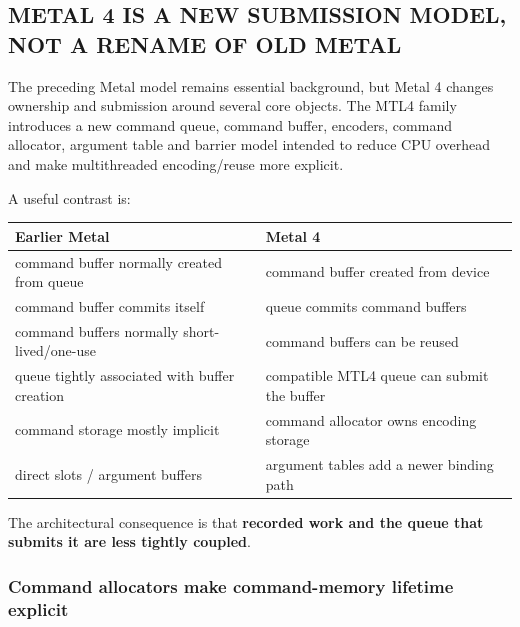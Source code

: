 \subsection{METAL 4 IS A NEW SUBMISSION MODEL, NOT A RENAME OF OLD METAL}\label{05-engine-i-ch022-metal-4-is-a-new-submission-model-not-a-rename-of-old-metal}

The preceding Metal model remains essential background, but Metal 4 changes ownership and submission around several core objects. The MTL4 family introduces a new command queue, command buffer, encoders, command allocator, argument table and barrier model intended to reduce CPU overhead and make multithreaded encoding/reuse more explicit.

A useful contrast is:

{\def\LTcaptype{none} %
\begin{longtable}[]{@{}
  >{\raggedright\arraybackslash}p{}
  >{\raggedright\arraybackslash}p{}@{}}
\toprule\noalign{}
\begin{minipage}[b]{\linewidth}\raggedright
Earlier Metal
\end{minipage} & \begin{minipage}[b]{\linewidth}\raggedright
Metal 4
\end{minipage} \\
\midrule\noalign{}
\endhead
\bottomrule\noalign{}
\endlastfoot
command buffer normally created from queue & command buffer created from device \\
command buffer commits itself & queue commits command buffers \\
command buffers normally short-lived/one-use & command buffers can be reused \\
queue tightly associated with buffer creation & compatible MTL4 queue can submit the buffer \\
command storage mostly implicit & command allocator owns encoding storage \\
direct slots / argument buffers & argument tables add a newer binding path \\
\end{longtable}
}

The architectural consequence is that \textbf{recorded work and the queue that submits it are less tightly coupled}.

\subsubsection{Command allocators make command-memory lifetime explicit}\label{05-engine-i-ch022-command-allocators-make-command-memory-lifetime-explicit}

